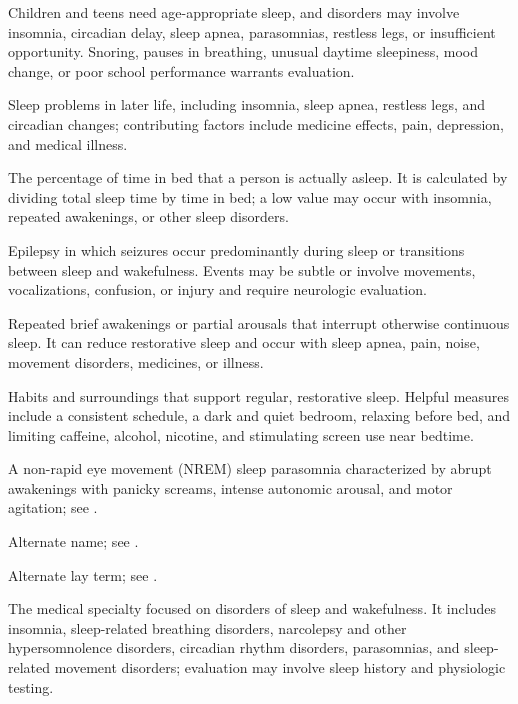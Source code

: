  Children and teens need age-appropriate sleep, and disorders may involve insomnia, circadian delay, sleep apnea, parasomnias, restless legs, or insufficient opportunity. Snoring, pauses in breathing, unusual daytime sleepiness, mood change, or poor school performance warrants evaluation.

 Sleep problems in later life, including insomnia, sleep apnea, restless legs, and circadian changes; contributing factors include medicine effects, pain, depression, and medical illness.

 The percentage of time in bed that a person is actually asleep. It is calculated by dividing total sleep time by time in bed; a low value may occur with insomnia, repeated awakenings, or other sleep disorders.

 Epilepsy in which seizures occur predominantly during sleep or transitions between sleep and wakefulness. Events may be subtle or involve movements, vocalizations, confusion, or injury and require neurologic evaluation.

 Repeated brief awakenings or partial arousals that interrupt otherwise continuous sleep. It can reduce restorative sleep and occur with sleep apnea, pain, noise, movement disorders, medicines, or illness.

 Habits and surroundings that support regular, restorative sleep. Helpful measures include a consistent schedule, a dark and quiet bedroom, relaxing before bed, and limiting caffeine, alcohol, nicotine, and stimulating screen use near bedtime.

 A non-rapid eye movement (NREM) sleep parasomnia characterized by abrupt awakenings with panicky screams, intense autonomic arousal, and motor agitation; see .

 Alternate name; see .

 Alternate lay term; see .

 The medical specialty focused on disorders of sleep and wakefulness. It
includes insomnia, sleep-related breathing disorders, narcolepsy and other hypersomnolence
disorders, circadian rhythm disorders, parasomnias, and sleep-related movement disorders;
evaluation may involve sleep history and physiologic testing.

